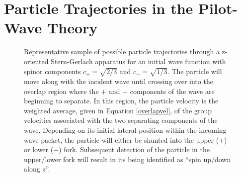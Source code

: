 \documentclass[aps,prc,onecolumn,letterpaper,floatfix,12pt]{revtex4}
\begin{document}
\section{Particle Trajectories in the Pilot-Wave Theory}
\label{sec3}




\begin{figure}[t]
\begin{center}
\scalebox{1.3}{

}
\caption{
Representative sample of possible particle trajectories through a
z-oriented Stern-Gerlach apparatus for an initial wave function with
spinor components $c_+ = \sqrt{2/3}$ and $c_- = \sqrt{1/3}$.  The
particle will move along with the incident wave until crossing over
into the overlap region where the $+$ and $-$ components of the wave
are beginning to separate.  In this region, the particle velocity is
the weighted average, given in Equation \eqref{overlapvel}, of the
group velocities associated with the two separating components of the
wave.  Depending on its initial lateral position within the incoming
wave packet, the particle will either be shunted into the upper ($+$)
or lower ($-$) fork.  Subsequent detection of the particle in the
upper/lower fork will result in its being identified as ``spin up/down
along $z$''.  
\label{fig2}
}
\end{center}
\end{figure}
\end{document}
